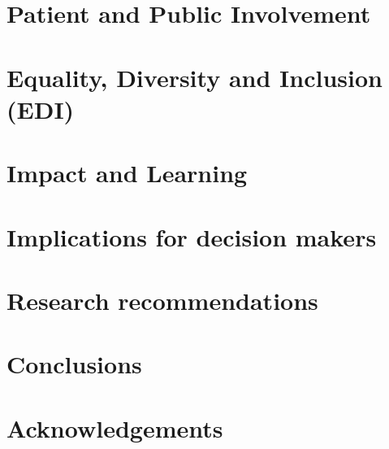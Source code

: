 
\section{Patient and Public Involvement}


\section{Equality, Diversity and Inclusion (EDI)}

\section{Impact and Learning}

\section{Implications for decision makers}

\section{Research recommendations}

\section{Conclusions}

\section{Acknowledgements}